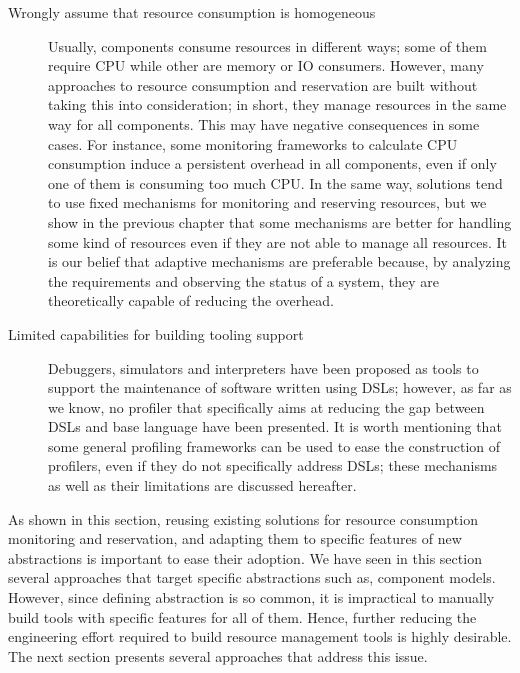 \begin{description}

\item[Wrongly assume that resource consumption is homogeneous]
Usually, components consume resources in different ways; some of them require CPU while other are memory or IO consumers.
However, many approaches to resource consumption and reservation are built without taking this into consideration; in short, they manage resources in the same way for all components.
This may have negative consequences in some cases.
For instance, some monitoring frameworks to calculate CPU consumption induce a persistent overhead in all components, even if only one of them is consuming too much CPU.
In the same way, solutions tend to use fixed mechanisms for monitoring and reserving resources, but we show in the previous chapter that some mechanisms are better for handling some kind of resources even if they are not able to manage all resources. 
It is our belief that adaptive mechanisms are preferable because, by analyzing the requirements and observing the status of a system, they are theoretically capable of reducing the overhead.

\item[Limited capabilities for building tooling support] Debuggers, simulators and interpreters have been proposed as tools to support the maintenance of software written using DSLs; however, as far as we know, no profiler that specifically aims at reducing the gap between DSLs and base language have been presented.
It is worth mentioning that some general profiling frameworks can be used to ease the construction of profilers, even if they do not specifically address DSLs; these mechanisms as well as their limitations are discussed hereafter.

\end{description}

As shown in this section, reusing existing solutions for resource consumption monitoring and reservation, and adapting them to specific features of new abstractions is important to ease their adoption.
We have seen in this section several approaches that target specific abstractions such as, component models.
However, since defining abstraction is so common, it is impractical to manually build tools with specific features for all of them.
Hence, further reducing the engineering effort required to build resource management tools is highly desirable.
The next section presents several approaches that address this issue.

